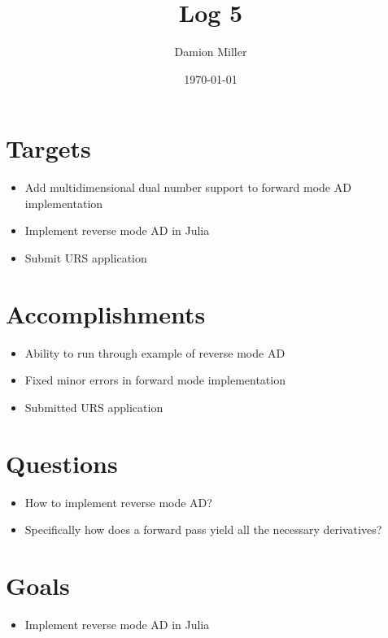 \documentclass[12pt, letterpaper]{article}
\title{Log 5}
\author{Damion Miller}
\date{\today}
\begin{document}
\maketitle
\section*{Targets}
\begin{itemize}
\item Add multidimensional dual number support to forward mode AD implementation
\item Implement reverse mode AD in Julia
\item Submit URS application 
\end{itemize}

\section*{Accomplishments}
\begin{itemize}
\item Ability to run through example of reverse mode AD
\item Fixed minor errors in forward mode implementation
\item Submitted URS application
\end{itemize}

\section*{Questions}
\begin{itemize}
\item How to implement reverse mode AD?
\item Specifically how does a forward pass yield all the necessary derivatives?
\end{itemize}

\section*{Goals}
\begin{itemize}
\item Implement reverse mode AD in Julia
\end{itemize}
\end{document}
